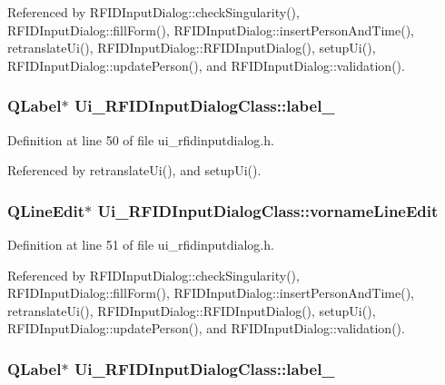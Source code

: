 Referenced by RFIDInputDialog::checkSingularity(), RFIDInputDialog::fillForm(), RFIDInputDialog::insertPersonAndTime(), retranslateUi(), RFIDInputDialog::RFIDInputDialog(), setupUi(), RFIDInputDialog::updatePerson(), and RFIDInputDialog::validation().\hypertarget{class_ui___r_f_i_d_input_dialog_class_ed9edc4c45c1e2d056d430cdc4afd4d1}{
\subsubsection[label\_\-2]{\setlength{\rightskip}{0pt plus 5cm}QLabel$\ast$ {\bf Ui\_\-RFIDInputDialogClass::label\_}}}
\label{class_ui___r_f_i_d_input_dialog_class_ed9edc4c45c1e2d056d430cdc4afd4d1}




Definition at line 50 of file ui\_\-rfidinputdialog.h.

Referenced by retranslateUi(), and setupUi().\hypertarget{class_ui___r_f_i_d_input_dialog_class_ff3670254a5ae940c6045463bae158ab}{
\subsubsection[vornameLineEdit]{\setlength{\rightskip}{0pt plus 5cm}QLineEdit$\ast$ {\bf Ui\_\-RFIDInputDialogClass::vornameLineEdit}}}
\label{class_ui___r_f_i_d_input_dialog_class_ff3670254a5ae940c6045463bae158ab}




Definition at line 51 of file ui\_\-rfidinputdialog.h.

Referenced by RFIDInputDialog::checkSingularity(), RFIDInputDialog::fillForm(), RFIDInputDialog::insertPersonAndTime(), retranslateUi(), RFIDInputDialog::RFIDInputDialog(), setupUi(), RFIDInputDialog::updatePerson(), and RFIDInputDialog::validation().\hypertarget{class_ui___r_f_i_d_input_dialog_class_c09be5c1ca2a14aa0e6770aeaebb2f81}{
\subsubsection[label\_\-3]{\setlength{\rightskip}{0pt plus 5cm}QLabel$\ast$ {\bf Ui\_\-RFIDInputDialogClass::label\_}}}
\label{class_ui___r_f_i_d_input_dialog_class_c09be5c1ca2a14aa0e6770aeaebb2f81}




